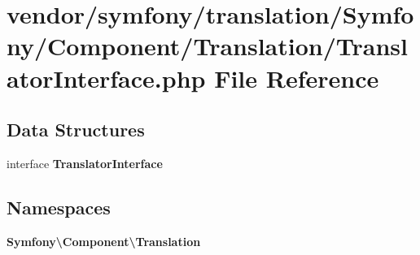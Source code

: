 \section{vendor/symfony/translation/\+Symfony/\+Component/\+Translation/\+Translator\+Interface.php File Reference}
\label{_translator_interface_8php}
\subsection*{Data Structures}
\begin{DoxyCompactItemize}
\item 
interface {\bf Translator\+Interface}
\end{DoxyCompactItemize}
\subsection*{Namespaces}
\begin{DoxyCompactItemize}
\item 
 {\bf Symfony\textbackslash{}\+Component\textbackslash{}\+Translation}
\end{DoxyCompactItemize}
